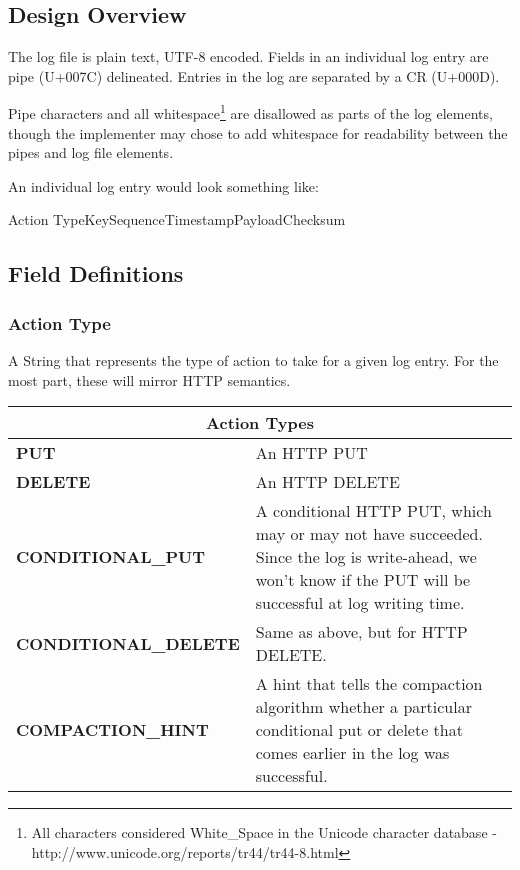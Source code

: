 \subsection{Design Overview}

The log file is plain text, UTF-8 encoded.  Fields in an individual log entry are pipe (U+007C) delineated.  Entries in the log are separated by a CR (U+000D).

Pipe characters and all whitespace\footnote{All characters considered White\_Space in the Unicode character database - http://www.unicode.org/reports/tr44/tr44-8.html} are disallowed as parts of the log elements, though the implementer may chose to add whitespace for readability between the pipes and log file elements.  

An individual log entry would look something like:
\begin{center}
Action Type\textbar Key\textbar Sequence\textbar Timestamp\textbar Payload\textbar Checksum
\end{center}


\subsection{Field Definitions}

\subsubsection{Action Type}
A String that represents the type of action to take for a given log entry.  For the most part, these will mirror HTTP semantics.

\begin{center}
\begin{tabular}{|l|p{3.5in}|}
\hline
\multicolumn{2}{|c|}{Action  Types}\\ \hline
\textbf{PUT} & An HTTP PUT\\ \hline
\textbf{DELETE} & An HTTP DELETE\\ \hline
\textbf{CONDITIONAL\_PUT} & A conditional HTTP PUT, which may or may not have succeeded.   Since the log is write-ahead, we won’t know if the PUT will be successful at log writing time.\\ \hline
\textbf{CONDITIONAL\_DELETE} & Same as above, but for HTTP DELETE.\\ \hline
\textbf{COMPACTION\_HINT} & A hint that tells the compaction algorithm whether a particular conditional put or delete that comes earlier in the log was successful.\\ \hline
\end{tabular}
\end{center}

